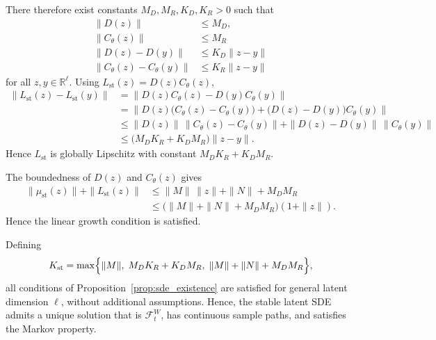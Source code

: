 \begin{description}[
    style=unboxed,
    leftmargin=0pt,
    labelindent=0pt,
    labelsep=0.5em
]
There therefore exist constants $M_D,M_R,K_D,K_R>0$ such that
\begin{align*}
    \|D(z)\|&\leq M_D, \\
    \|C_\theta(z)\|&\leq M_R\\
    \|D(z)-D(y)\|&\leq K_D\|z-y\|\\
    \|C_\theta(z)-C_\theta(y)\|&\leq K_R\|z-y\|
\end{align*}
for all $z,y\in\mathbb{R}^\ell$. Using $L_{\mathrm{st}}(z)=D(z)C_\theta(z)$,
\[
\begin{aligned}
\|L_{\mathrm{st}}(z)-L_{\mathrm{st}}(y)\|
&=
\|D(z)C_\theta(z)-D(y)C_\theta(y)\| \\
&=
\bigl\|
D(z)\bigl(C_\theta(z)-C_\theta(y)\bigr)
+
\bigl(D(z)-D(y)\bigr)C_\theta(y)
\bigr\| \\
&\leq
\|D(z)\|\,\|C_\theta(z)-C_\theta(y)\|
+
\|D(z)-D(y)\|\,\|C_\theta(y)\| \\
&\leq
\bigl(M_DK_R+K_DM_R\bigr)\|z-y\|.
\end{aligned}
\]
Hence $L_{\mathrm{st}}$ is globally Lipschitz with constant $M_DK_R+K_DM_R$.

\item[Linear growth.]
The boundedness of $D(z)$ and $C_\theta(z)$ gives
\[
\begin{aligned}
\|\mu_{\mathrm{st}}(z)\|+\|L_{\mathrm{st}}(z)\|
&\leq
\|M\|\,\|z\|+\|N\|+M_DM_R \\
&\leq
\bigl(\|M\|+\|N\|+M_DM_R\bigr)(1+\|z\|).
\end{aligned}
\]
Hence the linear growth condition is satisfied.

\end{description}


Defining
\[
K_{\mathrm{st}}
=
\max\Bigl\{
\|M\|,\;
M_DK_R+K_DM_R,\;
\|M\|+\|N\|+M_DM_R
\Bigr\},
\]
all conditions of Proposition~\ref{prop:sde_existence} are satisfied for general latent dimension $\ell$, without additional assumptions. Hence, the stable latent SDE admits a unique solution that is $\mathcal{F}_t^W$, has continuous sample paths, and satisfies the Markov property.
